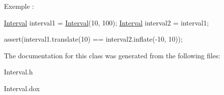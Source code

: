 Exemple \-: 
\begin{DoxyCode}
\hyperlink{classHurricane_1_1Interval_a02b04ad7ca380422098992fa8ff5f546}{Interval} interval1 = \hyperlink{classHurricane_1_1Interval_a02b04ad7ca380422098992fa8ff5f546}{Interval}(10, 100);
\hyperlink{classHurricane_1_1Interval_a02b04ad7ca380422098992fa8ff5f546}{Interval} interval2 = interval1;
 
assert(interval1.translate(10) == interval2.inflate(-10, 10));
\end{DoxyCode}
 

The documentation for this class was generated from the following files\-:\begin{DoxyCompactItemize}
\item 
Interval.\-h\item 
Interval.\-dox\end{DoxyCompactItemize}
